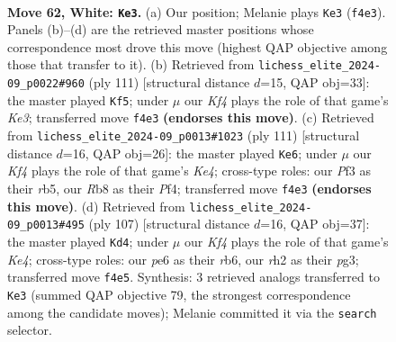 \documentclass[11pt]{article}
\begin{document}
\clearpage

\begin{figure}[p]\centering
\begin{subfigure}{0.46\textwidth}\centering
\resizebox{\linewidth}{!}{%
\newchessgame
\chessboard[
  setfen={1R6/3R1pk1/4p3/8/P3PK2/5P2/7r/8 w - - 15 62},
  showmover=false,
  pgfstyle=straightmove, color=movearrow, markmove={f4-e3}
]}
\caption{}
\end{subfigure}\hfill
\begin{subfigure}{0.46\textwidth}\centering
\resizebox{\linewidth}{!}{%
\newchessgame
\chessboard[
  setfen={R7/8/4k3/4p3/5p2/5P2/3r2PK/8 b - - 13 56},
  showmover=false,
  pgfstyle=straightmove, color=movearrow, markmove={e6-f5}
]}
\caption{}
\end{subfigure}
\\[4pt]
\begin{subfigure}{0.46\textwidth}\centering
\resizebox{\linewidth}{!}{%
\newchessgame
\chessboard[
  setfen={8/8/8/1R2kp2/5p2/5P2/r1PK4/8 b - - 4 56},
  showmover=false,
  pgfstyle=straightmove, color=movearrow, markmove={e5-e6}
]}
\caption{}
\end{subfigure}\hfill
\begin{subfigure}{0.46\textwidth}\centering
\resizebox{\linewidth}{!}{%
\newchessgame
\chessboard[
  setfen={8/8/1R6/1P2kp2/4p3/6P1/1r3P2/5K2 b - - 9 54},
  showmover=false,
  pgfstyle=straightmove, color=movearrow, markmove={e5-d4}
]}
\caption{}
\end{subfigure}
\caption{\textbf{Move 62, White: \texttt{Ke3}.} (a) Our position; Melanie plays \texttt{Ke3} (\texttt{f4e3}). Panels (b)--(d) are the retrieved master positions whose correspondence most drove this move (highest QAP objective among those that transfer to it). (b) Retrieved from \texttt{lichess\_elite\_2024-09\_p0022\#960} (ply 111) [structural distance $d$=15, QAP obj=33]: the master played \texttt{Kf5}; under $\mu$ our \emph{Kf4} plays the role of that game's \emph{Ke3}; transferred move \texttt{f4e3} \textbf{(endorses this move)}. (c) Retrieved from \texttt{lichess\_elite\_2024-09\_p0013\#1023} (ply 111) [structural distance $d$=16, QAP obj=26]: the master played \texttt{Ke6}; under $\mu$ our \emph{Kf4} plays the role of that game's \emph{Ke4}; cross-type roles: our \emph{P}f3 as their \emph{r}b5, our \emph{R}b8 as their \emph{P}f4; transferred move \texttt{f4e3} \textbf{(endorses this move)}. (d) Retrieved from \texttt{lichess\_elite\_2024-09\_p0013\#495} (ply 107) [structural distance $d$=16, QAP obj=37]: the master played \texttt{Kd4}; under $\mu$ our \emph{Kf4} plays the role of that game's \emph{Ke4}; cross-type roles: our \emph{p}e6 as their \emph{r}b6, our \emph{r}h2 as their \emph{p}g3; transferred move \texttt{f4e5}. Synthesis: 3 retrieved analogs transferred to \texttt{Ke3} (summed QAP objective 79, the strongest correspondence among the candidate moves); Melanie committed it via the \texttt{search} selector.}
\label{fig:thought-m122}
\end{figure}
\end{document}
